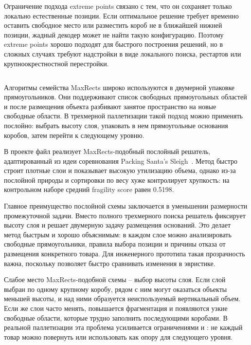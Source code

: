 Ограничение подхода extreme points связано с тем, что он сохраняет только локально естественные позиции. Если оптимальное решение требует временно оставить свободное место или разместить короб не в ближайшей нижней позиции, жадный декодер может не найти такую конфигурацию. Поэтому extreme points хорошо подходят для быстрого построения решений, но в сложных случаях требуют надстройки в виде локального поиска, рестартов или крупноокрестностной перестройки.

\subsection{}

Алгоритмы семейства MaxRects широко используются в двумерной упаковке прямоугольников. Они поддерживают список свободных прямоугольных областей и после размещения объекта разбивают занятое пространство на новые свободные области. В трехмерной паллетизации такой подход можно применять послойно: выбрать высоту слоя, упаковать в нем прямоугольные основания коробов, затем перейти к следующему уровню.

В проекте файл  реализует MaxRects-подобный послойный решатель, адаптированный из идеи соревнования Packing Santa's Sleigh~\cite{kaggle_sleigh}. Метод быстро строит плотные слои и показывает высокую утилизацию объема, однако из-за послойной природы и сортировки по весу хуже контролирует хрупкость: на контрольном наборе средний fragility score равен 0.5198.

Главное преимущество послойной схемы заключается в уменьшении размерности промежуточной задачи. Вместо полного трехмерного поиска решатель фиксирует высоту слоя и решает двумерную задачу размещения оснований. Это делает метод быстрым и хорошо объяснимым: в каждом слое можно анализировать свободные прямоугольники, правила выбора позиции и причины отказа от размещения конкретного товара. Для инженерного прототипа такая прозрачность важна, поскольку позволяет быстро сравнивать изменения в эвристике.

Слабое место MaxRects-подобной схемы -- выбор высоты слоя. Если слой выбран по одному крупному коробу, рядом с ним могут оказаться объекты меньшей высоты, и над ними образуется неиспользуемый вертикальный объем. Если же слои часто менять, повышается фрагментация и появляются узкие свободные области, которые трудно заполнить последующими коробами. В реальной паллетизации эта проблема усиливается ограничениями  и : не каждый товар можно повернуть или использовать как опору для следующего уровня.

